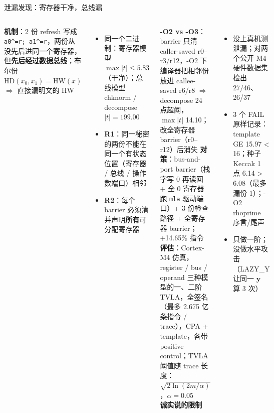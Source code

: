 \documentclass[aspectratio=169,10pt,fontset=none]{ctexbeamer}
\begin{document}
\begin{frame}{泄漏发现：寄存器干净，总线漏}
\begin{columns}[T]
\textbf{机制}：2 份 refresh 写成 \texttt{a0\^{}=r; a1\^{}=r}，两份从没先后进同一个寄存器，但\textbf{先后经过数据总线}；布尔份 $\mathrm{HD}(x_0,x_1)=\mathrm{HW}(x)$ $\Rightarrow$ 直接漏明文的 HW
\begin{itemize}
  \item 同一个二进制：寄存器模型 $\max|t|\le5.83$（干净）；总线模型 chknorm / decompose $|t|=199.00$
  \item \textbf{R1}：同一秘密的两份不能在同一个有状态位置（寄存器 / 总线 / 操作数端口）相邻
  \item \textbf{R2}：每个 barrier 必须清并声明\textbf{所有}可分配寄存器
\end{itemize}
\textbf{-O2 vs -O3}：barrier 只清 caller-saved r0--r3/r12，-O2 下编译器把相邻份放进 callee-saved r6/r8 $\Rightarrow$ decompose 24 点超阈，$\max|t|$ 14.10；改全寄存器 barrier（r0--r12）后消失
\textbf{对策}：bus-and-port barrier（栈字写 0 再读回 + 全 0 寄存器跑 \texttt{mla} 驱动端口）+ 3 份检查路径 + 全寄存器 barrier；+14.65\% 指令\\[3pt]
\textbf{评估}：Cortex-M4 仿真，register / bus / operand 三种模型的一、二阶 TVLA，全签名（最多 2.675 亿条指令 / trace），CPA + template，各带 positive control；TVLA 阈值随 trace 长度：$\sqrt{2\ln(2m/\alpha)}$，$\alpha=0.05$\\[3pt]
\textbf{诚实说的限制}
\begin{itemize}
  \item \alert{没上真机测泄漏}；对两个公开 M4 硬件数据集检出 27/46、26/37
  \item 3 个 FAIL 原样记录：template GE 15.97 < 16；种子 Keccak 1 点 6.14 > 6.08（最多漏份 1）；-O2 rhoprime 序言/尾声
  \item 只做一阶；没做水平攻击（LAZY\_Y 让同一 $\mathbf y$ 算 3 次）
\end{itemize}
\end{columns}
\end{frame}
\end{document}
